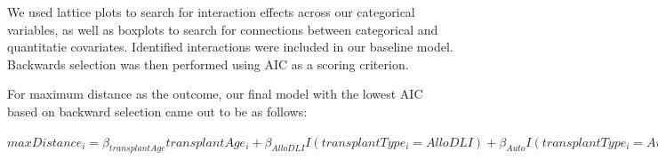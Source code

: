 \documentclass[12pt,twoside]{dukestatscithesis}
\begin{document}
We used lattice plots to search for interaction effects across our
categorical variables, as well as boxplots to search for connections
between categorical and quantitatie covariates. Identified interactions
were included in our baseline model. Backwards selection was then
performed using AIC as a scoring criterion.

For maximum distance as the outcome, our final model with the lowest AIC
based on backward selection came out to be as follows:

\(maxDistance_{i} = {\beta_{transplantAge}}transplantAge_{i} + {\beta_{AlloDLI}}I(transplantType_{i}=AlloDLI) + {\beta_{Auto}}I(transplantType_{i}=Auto) +{\beta_{Cord}}I(graftSource_{i}=Cord) + {\beta_{PBPC}}I(graftSource_{i}=PBPC) + {\beta_{Dead}}I(vitalStatus_{i}=Dead) + {\beta_{CGVHD}}I(CGVHD_{i}=1)+ {\beta_{anc500}}anc500_{i} + {\beta_{careEnv2}}I(careEnv_{i}=2) + {\beta_{careEnv3}}I(careEnv_{i}=3) + {\beta_{totalTimeSpan}}totalTimeSpan_{i} + {\beta_{vitalStatus/careEnv2}}I(vitalStatus/careEnv2_{i}=1) + {\beta_{vitalStatus/careEnv3}}I(vitalStatus/careEnv3_{i}=1)\)
\end{document}
